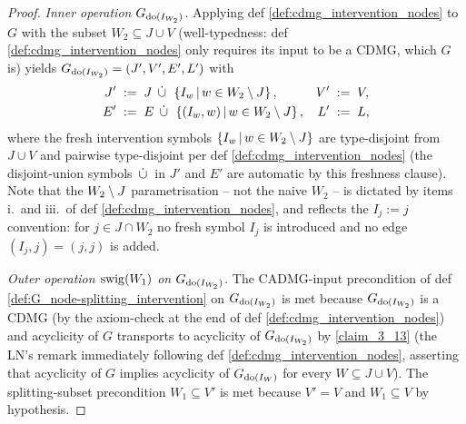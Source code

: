 \documentclass[main]{subfiles}
\begin{document}
\begin{proof}
\smallskip\noindent\emph{Inner operation $G_{\operatorname{do}(I_{W_2})}$.}
Applying def \ref{def:cdmg_intervention_nodes} to $G$ with the subset $W_2 \subseteq J \cup V$ (well-typedness: def \ref{def:cdmg_intervention_nodes} only requires its input to be a CDMG, which $G$ is) yields $G_{\operatorname{do}(I_{W_2})} = (J', V', E', L')$ with
\begin{align*}
    J' &\;:=\; J \;\,\dot{\cup}\,\; \left \{ I_w \,\middle|\, w \in W_2 \setminus J \right \}, & V' &\;:=\; V, \\
    E' &\;:=\; E \;\,\dot{\cup}\,\; \left \{ (I_w, w) \,\middle|\, w \in W_2 \setminus J \right \}, & L' &\;:=\; L,
\end{align*}
where the fresh intervention symbols $\left \{ I_w \,\middle|\, w \in W_2 \setminus J \right \}$ are type-disjoint from $J \cup V$ and pairwise type-disjoint per def \ref{def:cdmg_intervention_nodes} (the disjoint-union symbols $\,\dot{\cup}\,$ in $J'$ and $E'$ are automatic by this freshness clause). Note that the $W_2 \setminus J$ parametrisation -- not the naive $W_2$ -- is dictated by items i.\ and iii.\ of def \ref{def:cdmg_intervention_nodes}, and reflects the $I_j := j$ convention: for $j \in J \cap W_2$ no fresh symbol $I_j$ is introduced and no edge $(I_j, j) = (j, j)$ is added.

\smallskip\noindent\emph{Outer operation $\mathrm{swig}(W_1)$ on $G_{\operatorname{do}(I_{W_2})}$.}
The CADMG-input precondition of def \ref{def:G_node-splitting_intervention} on $G_{\operatorname{do}(I_{W_2})}$ is met because $G_{\operatorname{do}(I_{W_2})}$ is a CDMG (by the axiom-check at the end of def \ref{def:cdmg_intervention_nodes}) and acyclicity of $G$ transports to acyclicity of $G_{\operatorname{do}(I_{W_2})}$ by \ref{claim_3_13} (the LN's remark immediately following def \ref{def:cdmg_intervention_nodes}, asserting that acyclicity of $G$ implies acyclicity of $G_{\operatorname{do}(I_W)}$ for every $W \subseteq J \cup V$). The splitting-subset precondition $W_1 \subseteq V'$ is met because $V' = V$ and $W_1 \subseteq V$ by hypothesis.


\end{proof}
\end{document}
